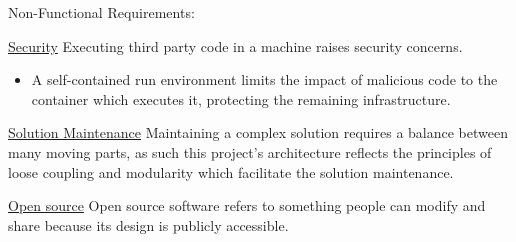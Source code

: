 \begin{flushleft}
Non-Functional Requirements:
\end{flushleft}

\begin{description}[font=$\bullet$~\normalfont\scshape\color{red!50!black}]
         
\item \underline{Security} Executing third party code in a machine raises security concerns.
	\begin{itemize}
		\item 
		\iffalse		
		Executing the services which will execute this code in containers adresses some of these concerns.
		\fi 
		A self-contained run environment limits the impact of malicious code to the container which executes it, protecting the remaining infrastructure.
	\end{itemize}	   
              
\item \underline{Solution Maintenance}     
        Maintaining a complex solution requires a balance between many moving parts, as such this project's architecture reflects the principles of loose coupling and modularity which facilitate the solution maintenance.      

\iffalse
\item \underline{Efficiency}    
        Hosting the solution in a cloud based environment improves efficiency of the solution. 
\fi
\item \underline{Open source}     
        Open source software refers to something people can modify and share because its design is publicly accessible.

\end{description}
\pagebreak
